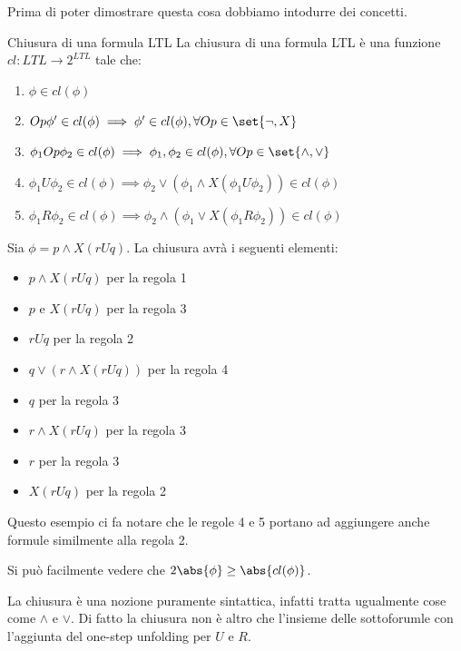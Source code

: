 Prima di poter dimostrare questa cosa dobbiamo intodurre dei concetti.

\begin{definition}{Chiusura di una formula LTL}
  La chiusura di una formula LTL è una funzione \(cl:LTL\to 2^{LTL}\) tale che:
  \begin{enumerate}
    \item \(\phi \in cl(\phi)\)
    \item \(Op\phi'\in cl(\phi)\implies \phi'\in cl(\phi), \forall Op \in \set{\neg,X}\)
    \item \(\phi_1 Op \phi_2 \in cl(\phi) \implies \phi_1, \phi_2 \in cl(\phi), \forall Op \in \set{\land,\lor}\)
    \item \(\phi_1 U \phi_2 \in cl(\phi) \implies \phi_2 \lor (\phi_1 \land X(\phi_1 U \phi_2)) \in cl(\phi)\)
    \item \(\phi_1 R \phi_2 \in cl(\phi) \implies \phi_2 \land (\phi_1 \lor X(\phi_1 R \phi_2)) \in cl(\phi)\)
  \end{enumerate}
\end{definition}

\begin{example}{}
  Sia \(\phi=p\land X(rUq)\).
  La chiusura avrà i seguenti elementi:
  \begin{itemize}
    \item \(p\land X(rUq)\) per la regola 1
    \item \(p\) e \(X(rUq)\) per la regola 3
    \item \(rUq\) per la regola 2
    \item \(q \lor (r \land X(rUq))\) per la regola 4
    \item \(q\) per la regola 3
    \item \(r \land X(rUq)\) per la regola 3
    \item \(r\) per la regola 3
    \item \(X(rUq)\) per la regola 2
  \end{itemize}

  Questo esempio ci fa notare che le regole 4 e 5 portano ad aggiungere anche formule similmente alla regola 2.

  Si può facilmente vedere che \(2\abs{\phi}\geq \abs{cl(\phi)}\).
\end{example}

La chiusura è una nozione puramente sintattica, infatti tratta ugualmente cose come \(\land\) e \(\lor\). Di fatto la chiusura non è altro che l'insieme delle sottoforumle con l'aggiunta del one-step unfolding per \(U\) e \(R\).

